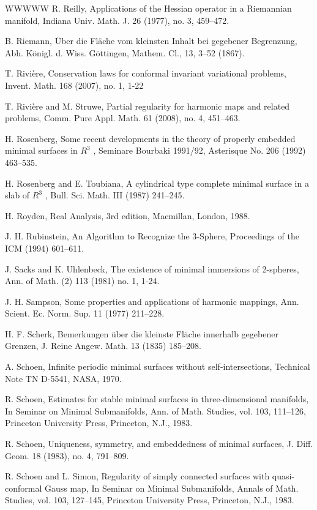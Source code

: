 \begin{thebibliography}{WWWWW}
 R. Reilly, Applications of the Hessian operator in a Riemannian manifold, Indiana Univ. Math. J. 26 (1977), no. 3, 459–472.

 B. Riemann, Über die Fläche vom kleinsten Inhalt bei gegebener Begrenzung, Abh. Königl. d. Wiss. Göttingen, Mathem. Cl., 13, 3–52 (1867).

 T. Rivière, Conservation laws for conformal invariant variational problems, Invent. Math. 168 (2007), no. 1, 1-22

 T. Rivière and M. Struwe, Partial regularity for harmonic maps and related problems, Comm. Pure Appl. Math. 61 (2008), no. 4, 451–463.

 H. Rosenberg, Some recent developments in the theory of properly embedded minimal surfaces in $R^{3}$ , Seminare Bourbaki 1991/92, Asterisque No. 206 (1992) 463–535.

 H. Rosenberg and E. Toubiana, A cylindrical type complete minimal surface in a slab of $R^{3}$ , Bull. Sci. Math. III (1987) 241–245.

 H. Royden, Real Analysis, 3rd edition, Macmillan, London, 1988.

 J. H. Rubinstein, An Algorithm to Recognize the 3-Sphere, Proceedings of the ICM (1994) 601–611.

 J. Sacks and K. Uhlenbeck, The existence of minimal immersions of 2-spheres, Ann. of Math. (2) 113 (1981) no. 1, 1-24.

 J. H. Sampson, Some properties and applications of harmonic mappings, Ann. Scient. Ec. Norm. Sup. 11 (1977) 211–228.

 H. F. Scherk, Bemerkungen über die kleinste Fläche innerhalb gegebener Grenzen, J. Reine Angew. Math. 13 (1835) 185–208.

 A. Schoen, Infinite periodic minimal surfaces without self-intersections, Technical Note TN D-5541, NASA, 1970.

 R. Schoen, Estimates for stable minimal surfaces in three-dimensional manifolds, In Seminar on Minimal Submanifolds, Ann. of Math. Studies, vol. 103, 111–126, Princeton University Press, Princeton, N.J., 1983.

 R. Schoen, Uniqueness, symmetry, and embeddedness of minimal surfaces, J. Diff. Geom. 18 (1983), no. 4, 791–809.

 R. Schoen and L. Simon, Regularity of simply connected surfaces with quasi-conformal Gauss map, In Seminar on Minimal Submanifolds, Annals of Math. Studies, vol. 103, 127–145, Princeton University Press, Princeton, N.J., 1983.


\end{thebibliography}
